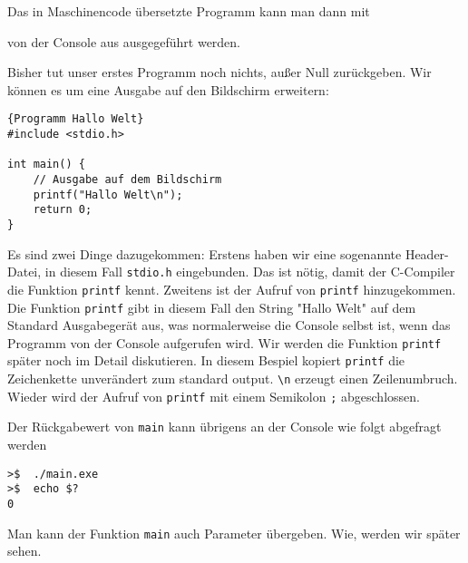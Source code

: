 \noindent Das in Maschinencode übersetzte Programm kann man dann mit

\vspace*{0.5cm}
\vspace*{0.5cm}

\noindent von der Console aus ausgegeführt werden. 

Bisher tut unser erstes Programm noch nichts, außer Null zurückgeben. 
Wir können es um eine Ausgabe auf den Bildschirm erweitern:
\begin{lstlisting}{Programm Hallo Welt}
#include <stdio.h>

int main() {
    // Ausgabe auf dem Bildschirm
    printf("Hallo Welt\n");
    return 0;
}
\end{lstlisting}
Es sind zwei Dinge dazugekommen:
Erstens haben wir eine sogenannte Header-Datei, in diesem Fall \texttt{stdio.h} eingebunden.
Das ist nötig, damit der C-Compiler die Funktion \texttt{printf} kennt.
Zweitens ist der Aufruf von \texttt{printf} hinzugekommen.
Die Funktion \texttt{printf} gibt in diesem Fall den String "Hallo Welt" auf dem Standard Ausgabegerät aus, was normalerweise die Console selbst ist, wenn das Programm von der Console aufgerufen wird. 
Wir werden die Funktion \texttt{printf} später noch im Detail diskutieren.
In diesem Bespiel kopiert \texttt{printf} die Zeichenkette unverändert zum standard output.
\verb|\n| erzeugt einen Zeilenumbruch.
Wieder wird der Aufruf von \texttt{printf} mit einem Semikolon \texttt{;} abgeschlossen.

Der Rückgabewert von \texttt{main} kann übrigens an der Console wie folgt abgefragt werden

\vspace*{0.5cm}
\begin{verbatim}
>$  ./main.exe
>$  echo $?
0
\end{verbatim}
\vspace*{0.5cm}

Man kann der Funktion \texttt{main} auch Parameter übergeben.
Wie, werden wir später sehen.
